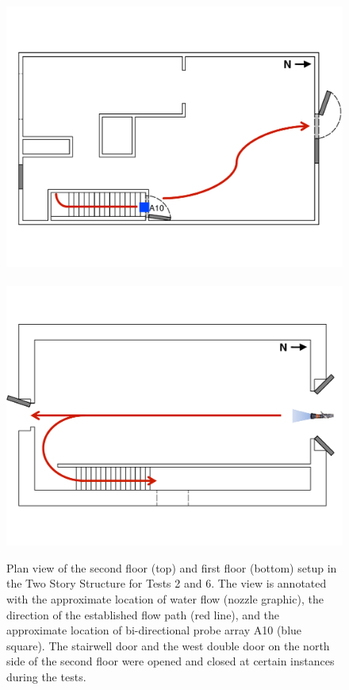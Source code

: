 \documentclass[12pt,oneside]{book}
\begin{document}
\begin{figure}[!ht]
	\includegraphics[width=\columnwidth]{../Figures/Floor_Plans/Specific_Tests/West_Hose_Test_2nd_Floor_Annotated}
	\\~\\
	\includegraphics[width=\columnwidth]{../Figures/Floor_Plans/Specific_Tests/West_Hose_Test_18_1st_Floor_Annotated}
	\caption[Plan view of the Two Story Structure setup for Tests 2 and 6.]{Plan view of the second floor (top) and first floor (bottom) setup in the Two Story Structure for Tests 2 and 6. The view is annotated with the approximate location of water flow (nozzle graphic), the direction of the established flow path (red line), and the approximate location of bi-directional probe array A10 (blue square). The stairwell door and the west double door on the north side of the second floor were opened and closed at certain instances during the tests.}
	\label{fig:flow_path_1}
\end{figure}
\end{document}
